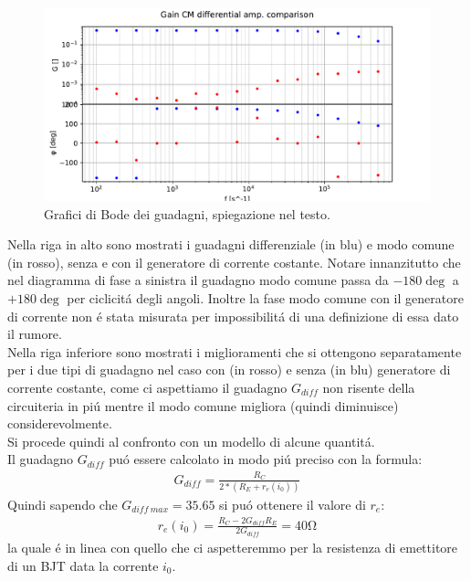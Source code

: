 \begin{figure}[h]
\begin{minipage}{0.5\textwidth}
    \end{minipage}\hfill
    \begin{minipage}{0.5\textwidth}
        \centering
        \includegraphics[width=\textwidth]{Figure_4.pdf} 
    \end{minipage}
    \caption{Grafici di Bode dei guadagni, spiegazione nel testo.}
    \label{fig:gains}
\end{figure}

Nella riga in alto sono mostrati i guadagni differenziale (in blu) e modo comune (in rosso), senza e con il generatore di corrente costante. Notare innanzitutto che nel diagramma di fase a sinistra il guadagno modo comune passa da $-180 \si{\deg}$ a $+180 \si{\deg}$ per ciclicit\'a degli angoli. Inoltre la fase modo comune con il generatore di corrente non \'e stata misurata per impossibilit\'a di una definizione di essa dato il rumore.\\
Nella riga inferiore sono mostrati i miglioramenti che si ottengono separatamente per i due tipi di guadagno nel caso con (in rosso) e senza (in blu) generatore di corrente costante, come ci aspettiamo il guadagno $G_{diff}$ non risente della circuiteria in pi\'u mentre il modo comune migliora (quindi diminuisce) considerevolmente.\\

Si procede quindi al confronto con un modello di alcune quantit\'a. \\
Il guadagno $G_{diff}$ pu\'o essere calcolato in modo pi\'u preciso con la formula:
\begin{gather}
	G_{diff}=\frac{R_C}{2*(R_E+r_e(i_0))}
\end{gather}
Quindi sapendo che $G_{diff\ max}=35.65$ si pu\'o ottenere il valore di $r_e$:
\begin{gather}
	r_e(i_0)=\frac{R_C-2 G_{diff} R_E}{2 G_{diff}}=40\si{\ohm}
\end{gather}
la quale \'e in linea con quello che ci aspetteremmo per la resistenza di emettitore di un BJT data la corrente $i_0$.

